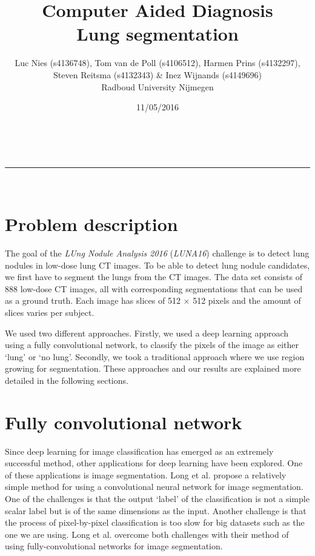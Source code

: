 \documentclass[a4paper,10pt]{article}
\makeatletter
\numberwithin{equation}{section} %
\numberwithin{figure}{section} %
\numberwithin{table}{section} %
\newcommand{\linia}{\rule{\linewidth}{0.5pt}}
\renewcommand{\maketitle}{
\begin{center}
\vspace{2ex}
{\huge \textsc{\@title}}
\vspace{1ex}
\\
\linia\\
\@author  \@date
\vspace{4ex}
\end{center}
}
\makeatother
\begin{document}
\title{Computer Aided Diagnosis \\\vspace{0.2cm} Lung segmentation}

\author{Luc Nies (s4136748), Tom van de Poll (s4106512), Harmen Prins (s4132297),\\ Steven Reitsma (s4132343) \& Inez Wijnands (s4149696)\\ Radboud University Nijmegen\\}

\date{11/05/2016}

\maketitle

\section{Problem description}
The goal of the \textit{LUng Nodule Analysis 2016} (\textit{LUNA16}) challenge is to detect lung nodules in low-dose lung CT images. To be able to detect lung nodule candidates, we first have to segment the lungs from the CT images. The data set consists of 888 low-dose CT images, all with corresponding segmentations that can be used as a ground truth. Each image has slices of 512 $\times$ 512 pixels and the amount of slices varies per subject.

We used two different approaches. Firstly, we used a deep learning approach using a fully convolutional network, to classify the pixels of the image as either `lung' or `no lung'. Secondly, we took a traditional approach where we use region growing for segmentation. These approaches and our results are explained more detailed in the following sections.

\section{Fully convolutional network}

Since deep learning for image classification has emerged as an extremely successful method, other applications for deep learning have been explored.
One of these applications is image segmentation.
Long et al. \cite{long2015fully} propose a relatively simple method for using a convolutional neural network for image segmentation.
One of the challenges is that the output `label' of the classification is not a simple scalar label but is of the same dimensions as the input.
Another challenge is that the process of pixel-by-pixel classification is too slow for big datasets such as the one we are using.
Long et al. \cite{long2015fully} overcome both challenges with their method of using fully-convolutional networks for image segmentation.
\end{document}
